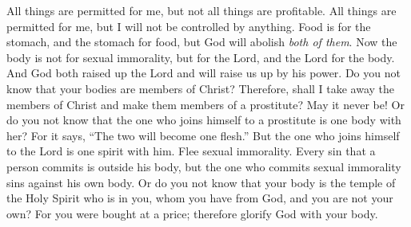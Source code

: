\begin{biblechapter}
 All things are permitted for me, but not all things are profitable. All things are permitted for me, but I will not be controlled by anything.
\verse Food is for the stomach, and the stomach for food, but God will abolish \textit{both of them}. Now the body is not for sexual immorality, but for the Lord, and the Lord for the body.
\verse And God both raised up the Lord and will raise us up by his power.
\verse Do you not know that your bodies are members of Christ? Therefore, shall I take away the members of Christ and make them members of a prostitute? May it never be!
\verse Or do you not know that the one who joins himself to a prostitute is one body with her? For it says, “The two will become one flesh.”
\verse But the one who joins himself to the Lord is one spirit with him.
\verse Flee sexual immorality. Every sin that a person commits is outside his body, but the one who commits sexual immorality sins against his own body.
\verse Or do you not know that your body is the temple of the Holy Spirit who is in you, whom you have from God, and you are not your own?
\verse For you were bought at a price; therefore glorify God with your body.
\end{biblechapter}

